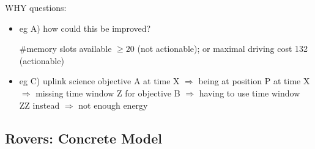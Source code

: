 WHY questions: 
\begin{itemize}
\item eg A) how could this be improved? 

  \#memory slots available $\geq 20$ (not actionable); or maximal
  driving cost 132 (actionable)

\item eg C) uplink science objective A at time X $\Rightarrow$ being
  at position P at time X $\Rightarrow$ missing time window Z for
  objective B $\Rightarrow$ having to use time window ZZ instead
  $\Rightarrow$ not enough energy
\end{itemize}









\subsection{Rovers: Concrete Model}
\label{xpp-rovers:concrete}


